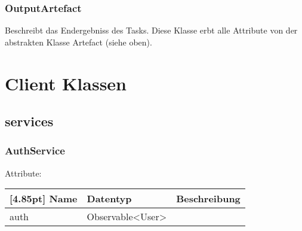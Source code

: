         \subsubsection{OutputArtefact}
			Beschreibt das Endergebniss des Tasks. \newline
			Diese Klasse erbt alle Attribute von der abstrakten Klasse Artefact (siehe oben).
			
		

%            


%

\newpage

    \section{Client Klassen}
    
        \subsection{services}
        
            \subsubsection{AuthService}
            
                Attribute:
                \begin{center}
                	\renewcommand{\arraystretch}{1.5}
                    \setlength\tabcolsep{5pt}
                	\begin{tabularx}{\textwidth}{|l|l|X|}
                		\hline
                        \rowcolor[gray]{0.75}[4.85pt]            		
                	    Name & Datentyp & Beschreibung \\ \hline
                        auth & Observable<User> & \\ \hline
                	\end{tabularx}
                \end{center}
                

